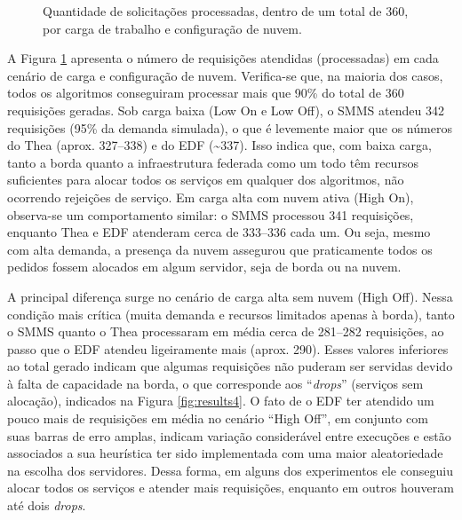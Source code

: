 \begin{figure}[ht!]
    \caption{Quantidade de solicitações processadas, dentro de um total de 360, por carga de trabalho e configuração de nuvem.}
    \label{fig:results3}
\end{figure}

A Figura \ref{fig:results3} apresenta o número de requisições atendidas (processadas) em cada cenário de carga e configuração de nuvem. Verifica-se que, na maioria dos casos, todos os algoritmos conseguiram processar mais que 90\% do total de 360 requisições geradas. Sob carga baixa (Low On e Low Off), o SMMS atendeu 342 requisições (95\% da demanda simulada), o que é levemente maior que os números do Thea (aprox. 327–338) e do EDF (\textasciitilde337). Isso indica que, com baixa carga, tanto a borda quanto a infraestrutura federada como um todo têm recursos suficientes para alocar todos os serviços em qualquer dos algoritmos, não ocorrendo rejeições de serviço. Em carga alta com nuvem ativa (High On), observa-se um comportamento similar: o SMMS processou 341 requisições, enquanto Thea e EDF atenderam cerca de 333–336 cada um. Ou seja, mesmo com alta demanda, a presença da nuvem assegurou que praticamente todos os pedidos fossem alocados em algum servidor, seja de borda ou na nuvem.

A principal diferença surge no cenário de carga alta sem nuvem (High Off). Nessa condição mais crítica (muita demanda e recursos limitados apenas à borda), tanto o SMMS quanto o Thea processaram em média cerca de 281–282 requisições, ao passo que o EDF atendeu ligeiramente mais (aprox. 290). Esses valores inferiores ao total gerado indicam que algumas requisições não puderam ser servidas devido à falta de capacidade na borda, o que corresponde aos ``\textit{drops}'' (serviços sem alocação), indicados na Figura \ref{fig:results4}. O fato de o EDF ter atendido um pouco mais de requisições em média no cenário ``High Off'', em conjunto com suas barras de erro amplas, indicam variação considerável entre execuções e estão associados a sua heurística ter sido implementada com uma maior aleatoriedade na escolha dos servidores. Dessa forma, em alguns dos experimentos ele conseguiu alocar todos os serviços e atender mais requisições, enquanto em outros houveram até dois \textit{drops}.
